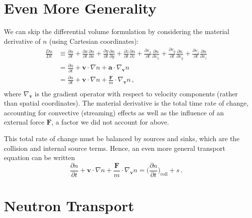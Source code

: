 \section*{Even More Generality}
We can skip the differential volume formulation by considering the material derivative of $n$ (using Cartesian coordinates):
\begin{equation}
 \begin{split}
 \frac{Dn}{Dt} &\equiv \frac{ \partial n}{\partial t} 
 + \frac{\partial x}{\partial t}\frac{\partial n}{\partial x} + \frac{\partial y}{\partial t}\frac{\partial n}{\partial y} + \frac{\partial z}{\partial t}\frac{\partial n}{\partial z} +  \frac{\partial v_x}{\partial t}\frac{\partial n}{\partial v_x} +  \frac{\partial v_y}{\partial t}\frac{\partial n}{\partial v_y} +  \frac{\partial v_z}{\partial t}\frac{\partial n}{\partial v_z} \\
               &= \frac{ \partial n}{\partial t} + \mathbf{v}\cdot \nabla n + \mathbf{a} \cdot \nabla_{\mathbf{v}} n \\
               &= \frac{ \partial n}{\partial t} + \mathbf{v}\cdot \nabla n + \frac{\mathbf{F}}{m} \cdot \nabla_{\mathbf{v}} n \, ,\\
 \end{split}
\end{equation}
where $\nabla_{\mathbf{v}}$ is the gradient operator with respect to velocity components (rather than spatial coordinates).  The material derivative is the total time rate of change, accounting for convective (streaming) effects as well as the influence of an external force $\mathbf{F}$, a factor we did not account for above.  

This total rate of change must be balanced by sources and sinks, which are the collision and internal source terms.  Hence, an even more general transport equation can be written
\begin{equation}
  \frac{\partial n}{\partial t} + \mathbf{v} \cdot \nabla n + \frac{\mathbf{F}}{m} \cdot \nabla_{\mathbf{v}} n =   \Big( \frac{\partial n}{\partial t} \Big )_{\mathrm{coll}} +  s \, .
 \label{eq:generalte}
\end{equation}

\section*{Neutron Transport}

